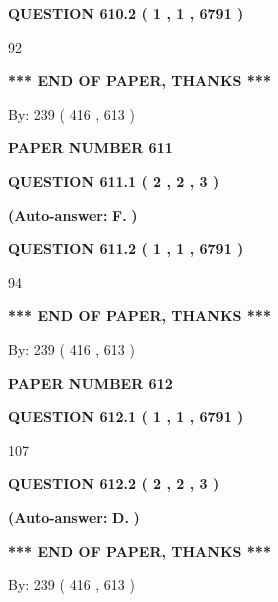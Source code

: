 \documentclass{ctexart}
\begin{document}
  
{\textbf{\large{QUESTION
610.2 
 ( 1 , 1 , 6791 )
}}}

92
   
   
   
   
\vspace{1.0in} 
{\textbf{\large{ *** END OF PAPER, THANKS *** }}} 
   
   
\hspace{1.0in} By: 
 239 ( 416 ,  613 )
   
   
   
   
\newpage 
\setcounter{page}{ 
   611001 } 
   
   
 {\textbf{ \Large{ PAPER NUMBER  611  }}}
   
   
   
   
  
  
{\textbf{\large{QUESTION
611.1 
 ( 2 , 2 , 3 )
}}}
 
 
{\textbf{(Auto-answer:}}
{\textbf{\large{
F.}}}
{\textbf{)}}
 
 
  
  
{\textbf{\large{QUESTION
611.2 
 ( 1 , 1 , 6791 )
}}}

94
   
   
   
   
\vspace{1.0in} 
{\textbf{\large{ *** END OF PAPER, THANKS *** }}} 
   
   
\hspace{1.0in} By: 
 239 ( 416 ,  613 )
   
   
   
   
\newpage 
\setcounter{page}{ 
   612001 } 
   
   
 {\textbf{ \Large{ PAPER NUMBER  612  }}}
   
   
   
   
  
  
{\textbf{\large{QUESTION
612.1 
 ( 1 , 1 , 6791 )
}}}

107
  
  
{\textbf{\large{QUESTION
612.2 
 ( 2 , 2 , 3 )
}}}
 
 
{\textbf{(Auto-answer:}}
{\textbf{\large{
D.}}}
{\textbf{)}}
 
 
   
   
   
   
\vspace{1.0in} 
{\textbf{\large{ *** END OF PAPER, THANKS *** }}} 
   
   
\hspace{1.0in} By: 
 239 ( 416 ,  613 )
   
   
   
\end{document}
